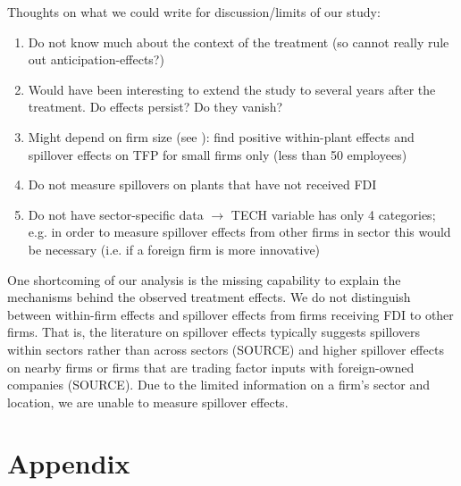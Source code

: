 \documentclass[a4paper,11pt]{scrartcl}
\newcommand{\sectionnumbering}[1]{%
  \setcounter{section}{0}%
   \renewcommand{\thesection}{\csname #1\endcsname{section}}}
\begin{document}
Thoughts on what we could write for discussion/limits of our study: 
\begin{enumerate}
\item Do not know much about the context of the treatment (so cannot really rule out anticipation-effects?)
\item Would have been interesting to extend the study to several years after the treatment. Do effects persist? Do they vanish? 
\item Might depend on firm size (see \citet{aitken99}): find positive within-plant effects and spillover effects on TFP for small firms only (less than 50 employees)
\item Do not measure spillovers on plants that have not received FDI
\item Do not have sector-specific data $\rightarrow$ TECH variable has only 4 categories; e.g. in order to measure spillover effects from other firms in sector this would be necessary (i.e. if a foreign firm is more innovative)
\end{enumerate}

One shortcoming of our analysis is the missing capability to explain the mechanisms behind the observed treatment effects. We do not distinguish between within-firm effects and spillover effects from firms receiving FDI to other firms. That is, the literature on spillover effects typically suggests spillovers within sectors rather than across sectors (SOURCE) and higher spillover effects on nearby firms or firms that are trading factor inputs with foreign-owned companies (SOURCE). Due to the limited information on a firm's sector and location, we are unable to measure spillover effects. 

\newpage

 
\newpage


\sectionnumbering{Roman}
\setcounter{page}{3} %

\appendix
\section{Appendix}
\end{document}
